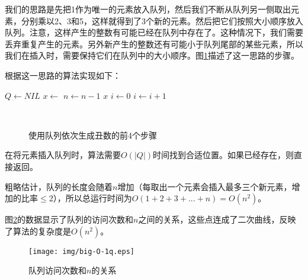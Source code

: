 \documentclass{article}
\begin{document}
我们的思路是先把1作为唯一的元素放入队列，然后我们不断从队列另一侧取出元素，分别乘以2、3和5，这样就得到了3个新的元素。然后把它们按照大小顺序放入队列。注意，这样产生的整数有可能已经在队列中存在了。这种情况下，我们需要丢弃重复产生的元素。另外新产生的整数还有可能小于队列尾部的某些元素，所以我们在插入时，需要保持它们在队列中的大小顺序。图\ref{fig:queues}描述了这一思路的步骤。

根据这一思路的算法实现如下：

\begin{algorithmic}[1]
  \State $Q \gets NIL$
  \State {}
    \State $x \gets$ 
    \State {}
    \State {}
    \State {}
    \State $n \gets n-1$
  \EndWhile
  \State \Return $x$
\EndFunction
\Statex
{}
  \State $i \gets 0$
    \State $i \gets i + 1$
  \EndWhile
    \State \Return
  \EndIf
  \State {}
\EndFunction
\end{algorithmic}

\begin{figure}[htbp]
  \centering
  \hspace{.1\textwidth}
  \\
  \hspace{.1\textwidth}
  \caption{使用队列依次生成丑数的前4个步骤} \label{fig:queues}
\end{figure}

在将元素插入队列时，算法需要$O(|Q|)$时间找到合适位置。如果已经存在，则直接返回。

粗略估计，队列的长度会随着$n$增加（每取出一个元素会插入最多三个新元素，增加的比率$\leq 2$），所以总运行时间为$O(1+2+3+...+n) = O(n^2)$。

图\ref{fig:big-O-1q}的数据显示了队列的访问次数和$n$之间的关系，这些点连成了二次曲线，反映了算法的复杂度是$O(n^2)$。

\begin{figure}[htbp]
  \centering
  \texttt{[image: img/big-O-1q.eps]}
  \caption{队列访问次数和$n$的关系} \label{fig:big-O-1q}
\end{figure}
\end{document}
